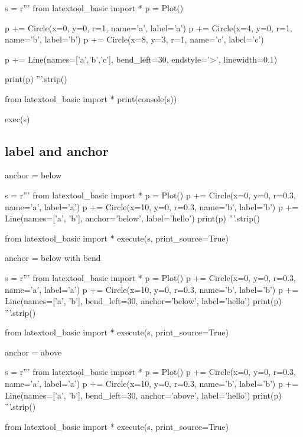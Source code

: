 \begin{python}
s = r'''
from latextool_basic import *
p = Plot()

p += Circle(x=0, y=0, r=1, name='a', label='a')
p += Circle(x=4, y=0, r=1, name='b', label='b')
p += Circle(x=8, y=3, r=1, name='c', label='c')

p += Line(names=['a','b','c'], bend_left=30, endstyle='>', linewidth=0.1)

print(p)
'''.strip()

from latextool_basic import *
print(console(s))

exec(s)
\end{python}




\newpage
\subsection{label and anchor}

anchor = below
\begin{python}
s = r'''
from latextool_basic import *
p = Plot()
p += Circle(x=0, y=0, r=0.3, name='a', label='a')
p += Circle(x=10, y=0, r=0.3, name='b', label='b')
p += Line(names=['a', 'b'], anchor='below', label='hello')
print(p)
'''.strip()

from latextool_basic import *
execute(s, print_source=True)
\end{python}





anchor = below with bend
\begin{python}
s = r'''
from latextool_basic import *
p = Plot()
p += Circle(x=0, y=0, r=0.3, name='a', label='a')
p += Circle(x=10, y=0, r=0.3, name='b', label='b')
p += Line(names=['a', 'b'], bend_left=30, anchor='below', label='hello')
print(p)
'''.strip()

from latextool_basic import *
execute(s, print_source=True)
\end{python}




\newpage
anchor = above
\begin{python}
s = r'''
from latextool_basic import *
p = Plot()
p += Circle(x=0, y=0, r=0.3, name='a', label='a')
p += Circle(x=10, y=0, r=0.3, name='b', label='b')
p += Line(names=['a', 'b'], bend_left=30, anchor='above', label='hello')
print(p)
'''.strip()

from latextool_basic import *
execute(s, print_source=True)
\end{python}


